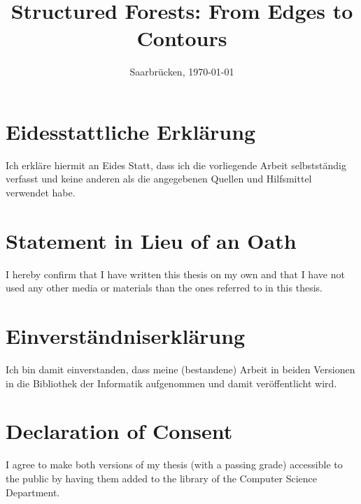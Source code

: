 \documentclass[a4paper, twoside]{Thesis}
\begin{document}
\frontmatter

\title  {Structured Forests: {F}rom Edges to Contours}

\addresses  {\groupname\\\deptname\\\univname}  %
\date       {Saarbr\"ucken, \today }
\subject    {}
\keywords   {}

\maketitle



\thispagestyle{empty}

\section*{Eidesstattliche Erkl\"{a}rung}
Ich erkl\"{a}re hiermit an Eides Statt, dass ich die vorliegende Arbeit selbstst\"{a}ndig verfasst und keine
anderen als die angegebenen Quellen und Hilfsmittel verwendet habe.

\vspace{0.60cm}
\section*{Statement in Lieu of an Oath}
I hereby confirm that I have written this thesis on my own and that I have not used any other media or
materials than the ones referred to in this thesis.
\vspace{1.5cm}

\section*{Einverst\"{a}ndniserkl\"{a}rung}
Ich bin damit einverstanden, dass meine (bestandene) Arbeit in beiden Versionen in die Bibliothek der
Informatik aufgenommen und damit ver\"{o}ffentlicht wird.

\vspace{0.60cm}
\section*{Declaration of Consent}
I agree to make both versions of my thesis (with a passing grade) accessible to the public by having
them added to the library of the Computer Science Department.
\vspace{3cm}
\end{document}
